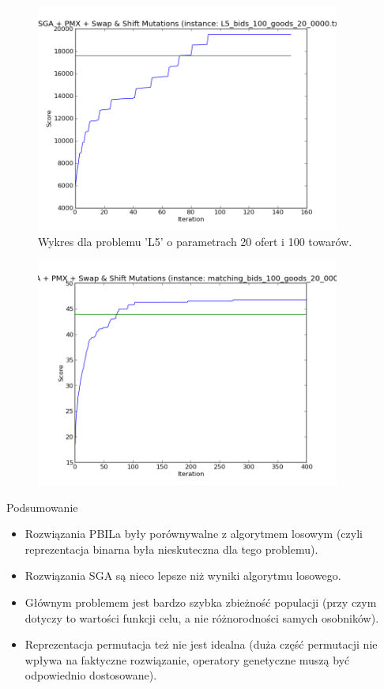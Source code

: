 \begin{frame}
    \begin{figure}
        \centering
        \includegraphics[width=10cm]{wykresy/L5_bids_100_goods_20_0000_txt_1.png}
        \caption{Wykres dla problemu 'L5' o parametrach 20 ofert i 100 towarów.}
    \end{figure}
\end{frame}

\begin{frame}
    \begin{figure}
        \centering
        \includegraphics[width=10cm]{wykresy/matching_bids_100_goods_20_0000_txt_uniq.png}
    \end{figure}
\end{frame}

\begin{frame}{Podsumowanie}
\begin{itemize}
\item Rozwiązania PBILa były porównywalne z algorytmem losowym (czyli reprezentacja binarna była nieskuteczna dla tego problemu).
\item Rozwiązania SGA są nieco lepsze niż wyniki algorytmu losowego.
\item Głównym problemem jest bardzo szybka zbieżność populacji (przy czym dotyczy to wartości funkcji celu, a nie różnorodności samych osobników).
\item Reprezentacja permutacja też nie jest idealna (duża część permutacji nie wpływa na faktyczne rozwiązanie, operatory genetyczne muszą być odpowiednio dostosowane).
\end{itemize}
\end{frame}

